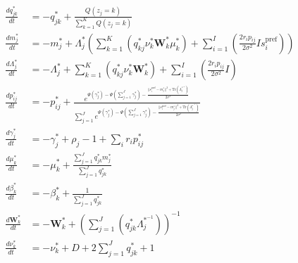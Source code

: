 \documentclass[12pt]{article}
\begin{document}
\begin{equation}
\begin{aligned}
\frac{d q_{jk}^*}{dt} &= - q_{jk}^* + \frac{Q(z_j = k)}{\sum_{k=1}^K Q(z_j = k)}\\
\frac{d m_j^*}{dt} &= - m_j^* + \Lambda^*_j (\sum_{k=1}^K (q_{kj}^* \nu^*_k \mathbf{W}^*_k \mu^*_k) + \sum_{i=1}^I (\frac{2 r_i p_{ij}}{2 \sigma^2} I s_i^{\text{pref}}))\\
\frac{d \Lambda^*_j}{dt} &= - \Lambda^*_j + \sum_{k=1}^K (q_{kj}^* \nu^*_k \mathbf{W}^*_k) + \sum_{i=1}^I (\frac{2 r_i p_{ij}}{2 \sigma^2}I)\\
\frac{d p_{ij}^*}{dt} &= - p_{ij}^* + \frac{e^{\Psi(\gamma_j^*) - \Psi(\sum_{j=1}^J \gamma_j^*) - \frac{||s_i^{\text{pref}} - m_j^*||^2 + \text{Tr}(\Lambda_j^{*^{-1}})}{2 \sigma^2}}}{\sum_{j=1}^J e^{\Psi(\gamma_j^*) - \Psi(\sum_{j=1}^J \gamma_j^*) - \frac{||s_i^{\text{pref}} - m_j^*||^2 + \text{Tr}(\Lambda_j^{*^{-1}})}{2 \sigma^2}}}\\
\frac{d \gamma_j^*}{dt} &= - \gamma_j^* + \rho_j - 1 + \sum_i r_i p^*_{ij}\\
\frac{d \mu_k^*}{dt} &= - \mu_k^* + \frac{\sum_{j=1}^J q_{jk}^*m_j^*}{\sum_{j=1}^J q_{jk}^*}\\
\frac{d \beta_k^*}{dt} &= - \beta_k^* + \frac{1}{\sum_{j=1}^J q_{jk}^*}\\
\frac{d \mathbf{W}^*_k}{dt} &= - \mathbf{W}^*_k + (\sum_{j=1}^J (q_{jk}^* \Lambda_j^{*^{-1}}))^{-1}\\
\frac{d \nu^*_k}{dt} &= - \nu^*_k + D + 2 \sum_{j=1}^J q_{jk}^* + 1
\end{aligned}
\end{equation}
\end{document}
